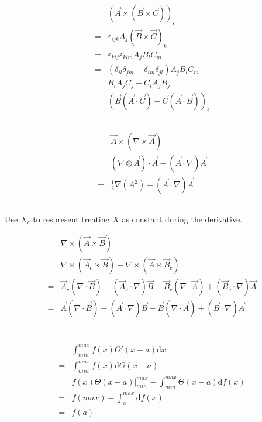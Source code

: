 \documentclass[10pt,fleqn]{article}
\newcommand{\ud}{\mathrm{d}}
\newcommand{\eqar}[1]
{
  \begin{align*}
    #1
  \end{align*}
}
\newcommand{\paren}[1]{{\left({#1}\right)}}
\begin{document}
\section{}
\subsection{}
\eqar{
  &\paren{\vec A\times\paren{\vec B\times\vec C}}_i\\
  =&\varepsilon_{ijk}A_j\paren{\vec B\times\vec C}_k\\
  =&\varepsilon_{kij}\varepsilon_{klm}A_jB_lC_m\\
  =&\paren{\delta_{il}\delta_{jm}-\delta_{im}\delta_{jl}}A_jB_lC_m\\
  =&B_iA_jC_j-C_iA_jB_j\\
  =&\paren{\vec B\paren{\vec A\cdot\vec C}-\vec C\paren{\vec A\cdot\vec B}}_i
}

\subsection{}
\eqar{
  &\vec A\times\paren{\nabla\times\vec A}\\
  =&\paren{\nabla\otimes\vec A}\cdot\vec A-\paren{\vec A\cdot\nabla}\vec A\\
  =&\frac12\nabla\paren{A^2}-\paren{\vec A\cdot\nabla}\vec A
}

\subsection{}
Use $X_c$ to respresent treating $X$ as constant during the derivative.
\eqar{
  &\nabla\times(\vec A\times\vec B)\\
  =&\nabla\times(\vec A_c\times\vec B)+\nabla\times(\vec A\times\vec B_c)\\
  =&\vec A_c(\nabla\cdot\vec B)-(\vec A_c\cdot\nabla)\vec B-\vec B_c(\nabla\cdot\vec A)+(\vec B_c\cdot\nabla)\vec A\\
  =&\vec A(\nabla\cdot\vec B)-(\vec A\cdot\nabla)\vec B-\vec B(\nabla\cdot\vec A)+(\vec B\cdot\nabla)\vec A
}

\section{}
\subsection{}
\eqar{
  &\int^{max}_{min} f(x)\Theta'(x-a)\ud x\\
  =&\int^{max}_{min} f(x)\ud\Theta(x-a)\\
  =&\left.f(x)\Theta(x-a)\right|^{max}_{min}-\int^{max}_{min}\Theta(x-a)\ud f(x)\\
  =&f(max)-\int^{max}_{a}\ud f(x)\\
  =&f(a)
}
\end{document}
